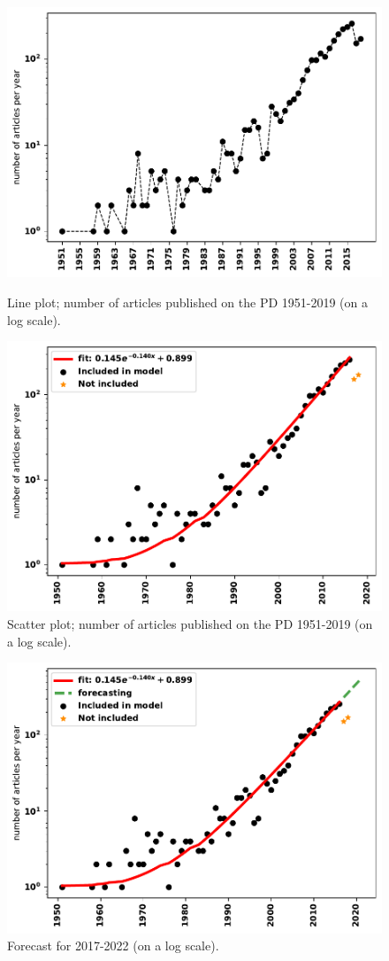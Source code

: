\documentclass{article}
\theoremstyle{definition}
\begin{document}
\begin{figure}[!hbtp]
\begin{minipage}{.45\textwidth}
    \centering
    \includegraphics[width=.85\textwidth]{./assets/images/timeline.pdf}
    \caption{Line plot; number of articles published on the PD 1951-2019 (on a log scale).}\label{fig:timeseries}
\end{minipage}
\begin{minipage}{.45\textwidth}
    \centering
    \includegraphics[width=.85\textwidth]{./assets/images/fitting.pdf}
    \caption{Scatter plot; number of articles published on the PD 1951-2019 (on a log scale).}\label{fig:fitting}
\end{minipage}
\end{figure}

\begin{figure}[!hbtp]
    \centering
    \includegraphics[width=.40\textwidth]{./assets/images/forecasting.pdf}
    \caption{Forecast for 2017-2022 (on a log scale).}\label{fig:forecasting}
\end{figure}
\end{document}
